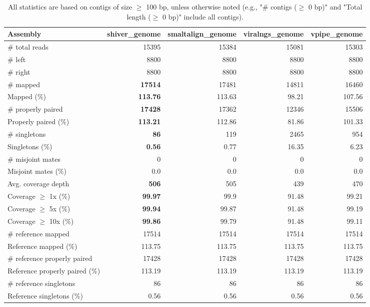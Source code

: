 \documentclass[12pt,a4paper]{article}
\begin{document}
\begin{table}[ht]
\begin{center}
\caption{All statistics are based on contigs of size $\geq$ 100 bp, unless otherwise noted (e.g., "\# contigs ($\geq$ 0 bp)" and "Total length ($\geq$ 0 bp)" include all contigs).}
\begin{tabular}{|l*{4}{|r}|}
\hline
Assembly & shiver\_genome & smaltalign\_genome & viralngs\_genome & vpipe\_genome \\ \hline
\# total reads & 15395 & 15384 & 15081 & 15303 \\ \hline
\# left & 8800 & 8800 & 8800 & 8800 \\ \hline
\# right & 8800 & 8800 & 8800 & 8800 \\ \hline
\# mapped & {\bf 17514} & 17481 & 14811 & 16460 \\ \hline
Mapped (\%) & {\bf 113.76} & 113.63 & 98.21 & 107.56 \\ \hline
\# properly paired & {\bf 17428} & 17362 & 12346 & 15506 \\ \hline
Properly paired (\%) & {\bf 113.21} & 112.86 & 81.86 & 101.33 \\ \hline
\# singletons & {\bf 86} & 119 & 2465 & 954 \\ \hline
Singletons (\%) & {\bf 0.56} & 0.77 & 16.35 & 6.23 \\ \hline
\# misjoint mates & 0 & 0 & 0 & 0 \\ \hline
Misjoint mates (\%) & 0.0 & 0.0 & 0.0 & 0.0 \\ \hline
Avg. coverage depth & {\bf 506} & 505 & 439 & 470 \\ \hline
Coverage $\geq$ 1x (\%) & {\bf 99.97} & 99.9 & 91.48 & 99.21 \\ \hline
Coverage $\geq$ 5x (\%) & {\bf 99.94} & 99.87 & 91.48 & 99.19 \\ \hline
Coverage $\geq$ 10x (\%) & {\bf 99.86} & 99.79 & 91.48 & 99.11 \\ \hline
\# reference mapped & 17514 & 17514 & 17514 & 17514 \\ \hline
Reference mapped (\%) & 113.75 & 113.75 & 113.75 & 113.75 \\ \hline
\# reference properly paired & 17428 & 17428 & 17428 & 17428 \\ \hline
Reference properly paired (\%) & 113.19 & 113.19 & 113.19 & 113.19 \\ \hline
\# reference singletons & 86 & 86 & 86 & 86 \\ \hline
Reference singletons (\%) & 0.56 & 0.56 & 0.56 & 0.56 \\ \hline

\end{tabular}
\end{center}
\end{table}
\end{document}

